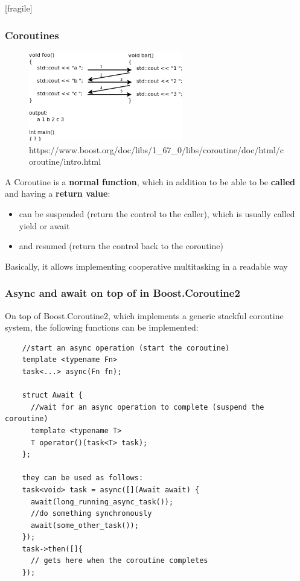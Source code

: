 \begin{frame}{[fragile]}
	\frametitle{Coroutines}
	\begin{figure}[ht]
		\centering
		\includegraphics[width=0.6\textwidth]{img/foo_bar}\\
		{\tiny https://www.boost.org/doc/libs/1\_67\_0/libs/coroutine/doc/html/coroutine/intro.html}\\
	\end{figure}

	A Coroutine is a \textbf{normal function}, which in addition to be able to be \textbf{called} and having a \textbf{return value}:
	\begin{itemize}
		\item can be suspended (return the control to the caller), which is usually called yield or await
		\item and resumed (return the control back to the coroutine)
	\end{itemize}
	Basically, it allows implementing cooperative multitasking in a readable way
\end{frame}%

\begin{frame}[fragile]
	\frametitle{Async and await on top of  in Boost.Coroutine2}
	On top of Boost.Coroutine2, which implements a generic stackful coroutine system, the following functions can be implemented:
	\begin{verbatim}
    //start an async operation (start the coroutine)
    template <typename Fn>
    task<...> async(Fn fn);

    struct Await {
      //wait for an async operation to complete (suspend the coroutine)
      template <typename T>
      T operator()(task<T> task);
    };

    they can be used as follows:
    task<void> task = async([](Await await) {
      await(long_running_async_task());
      //do something synchronously
      await(some_other_task());
    });
    task->then([]{
      // gets here when the coroutine completes
    });
  \end{verbatim}
\end{frame}


